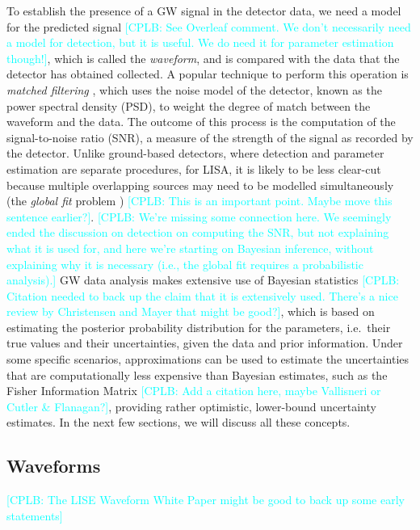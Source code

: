 \documentclass[a4paper,12pt]{article}
\newcommand{\cplb}[1]{\textcolor{cyan}{[CPLB: #1]}}
\begin{document}
To establish the presence of a GW signal in the detector data, we need a model for the predicted signal \cplb{See Overleaf comment. We don't necessarily need a model for detection, but it is useful. We do need it for parameter estimation though!}, which is called the \textit{waveform}, and is compared with the data that the detector has obtained collected. 
A popular technique to perform this operation is \textit{matched filtering} \cite{abbott2020guide}, which uses the noise model of the detector, known as the power spectral density (PSD), to weight the degree of match between the waveform and the data. 
The outcome of this process is the computation of the signal-to-noise ratio (SNR), a measure of the strength of the signal as recorded by the detector. 
Unlike ground-based detectors, where detection and parameter estimation are separate procedures, for LISA, it is likely to be less clear-cut because multiple overlapping sources may need to be modelled simultaneously (the \textit{global fit} problem \cite{littenberg2023prototype}) \cplb{This is an important point. Maybe move this sentence earlier?}. 
\cplb{We're missing some connection here. We seemingly ended the discussion on detection on computing the SNR, but not explaining what it is used for, and here we're starting on Bayesian inference, without explaining why it is necessary (i.e., the global fit requires a probabilistic analysis).}
GW data analysis makes extensive use of Bayesian statistics \cplb{Citation needed to back up the claim that it is extensively used. There's a nice review by Christensen and Mayer that might be good?}, which is based on estimating the posterior probability distribution for the parameters, i.e.\ their true values and their uncertainties, given the data and prior information. 
Under some specific scenarios, approximations can be used to estimate the uncertainties that are computationally less expensive than Bayesian estimates, such as the Fisher Information Matrix \cplb{Add a citation here, maybe Vallisneri or Cutler \& Flanagan?}, providing rather optimistic, lower-bound uncertainty estimates. In the next few sections, we will discuss all these concepts.

\subsection{Waveforms}
\label{subsec:waveforms}

\cplb{The LISE Waveform White Paper \cite{afshordi2023waveform} might be good to back up some early statements}
\end{document}
